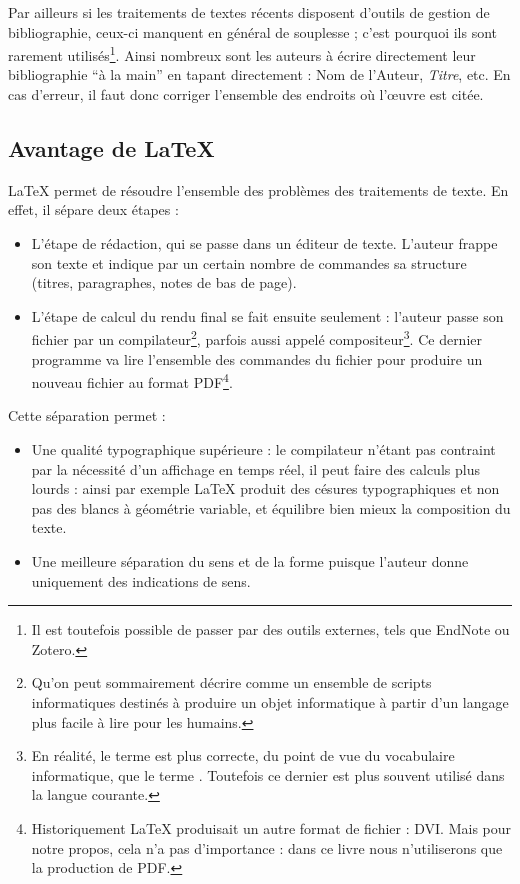Par ailleurs si les traitements de textes récents disposent d'outils de gestion de bibliographie, ceux-ci manquent en général de souplesse ; c'est pourquoi ils sont rarement utilisés\footnote{Il est toutefois possible de passer par des outils externes, tels que EndNote ou Zotero.}. Ainsi nombreux sont les auteurs à écrire directement leur bibliographie \enquote{à la main} en tapant directement : Nom de l'Auteur, \emph{Titre}, etc. En cas d'erreur, il faut donc corriger l'ensemble des endroits où l'œuvre est citée.

\subsection{Avantage de \LaTeX{}}

\LaTeX{} permet de résoudre l'ensemble des problèmes des traitements de texte. En effet, il sépare deux étapes : 

\begin{itemize}
\item L'étape de rédaction, qui se passe dans un éditeur de texte. L'auteur frappe son texte et indique par un certain nombre de commandes sa structure (titres, paragraphes, notes de bas de page).
\item L'étape de calcul du rendu final se fait ensuite seulement  : l'auteur  passe son fichier par un compilateur\footnote{Qu'on peut sommairement décrire comme un ensemble de scripts informatiques destinés à produire un objet informatique à partir d'un langage plus facile à lire pour les humains.}, parfois aussi appelé compositeur\footnote{En réalité, le terme  est plus correcte, du point de vue du vocabulaire informatique, que le terme . Toutefois ce dernier est plus souvent utilisé dans la langue courante.}. Ce dernier programme va lire l'ensemble des commandes du fichier pour produire un nouveau fichier au format PDF\footnote{Historiquement \LaTeX{} produisait un autre format de fichier : DVI. Mais pour notre propos, cela n'a pas d'importance : dans ce livre nous n'utiliserons que la production de PDF.}.
\end{itemize}

Cette séparation permet :
\begin{itemize}
\item Une qualité typographique supérieure :  le compilateur n'étant pas contraint par la nécessité d'un affichage en temps réel, il peut faire des calculs plus lourds : ainsi par exemple \LaTeX{} produit des césures typographiques et non pas des blancs à géométrie variable, et équilibre bien mieux la composition du texte.
\item Une meilleure séparation du sens et de la forme puisque l'auteur donne uniquement des indications de sens.
\end{itemize}


